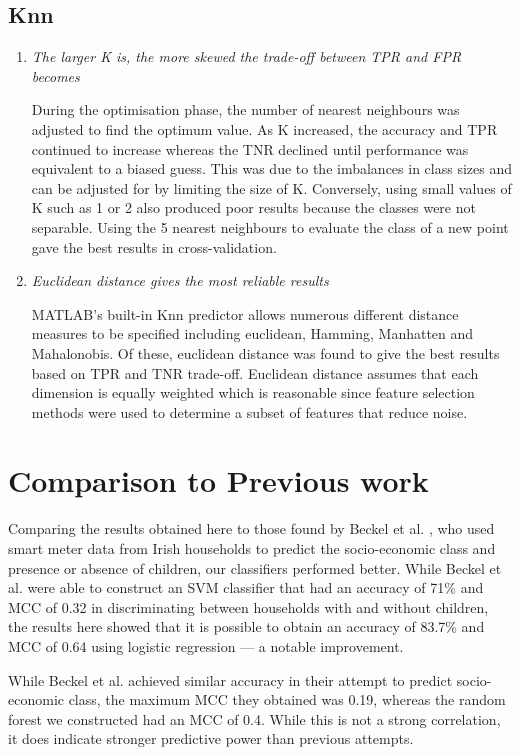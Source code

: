 \pagebreak
\subsection{Knn}

\begin{enumerate}

\item \textit{The larger K is, the more skewed the trade-off between TPR and FPR becomes}

During the optimisation phase, the number of nearest neighbours was adjusted to find the optimum value. As K increased, the accuracy and TPR continued to increase whereas the TNR declined until performance was equivalent to a biased guess. This was due to the imbalances in class sizes and can be adjusted for by limiting the size of K. Conversely, using small values of K such as 1 or 2 also produced poor results because the classes were not separable. Using the 5 nearest neighbours to evaluate the class of a new point gave the best results in cross-validation.

\item \textit{Euclidean distance gives the most reliable results}

MATLAB's built-in Knn predictor allows numerous different distance measures to be specified including euclidean, Hamming, Manhatten and Mahalonobis. Of these, euclidean distance was found to give the best results based on TPR and TNR trade-off. Euclidean distance assumes that each dimension is equally weighted which is reasonable since feature selection methods were used to determine a subset of features that reduce noise.
\end{enumerate}


\section{Comparison to Previous work}

Comparing the results obtained here to those found by Beckel et al. \cite{Beckel_1, Beckel_2, Beckel_3}, who used smart meter data from Irish households to predict the socio-economic class and presence or absence of children, our classifiers performed better. While Beckel et al. were able to construct an SVM classifier that had an accuracy of 71\% and MCC of 0.32 in discriminating between households with and without children, the results here showed that it is possible to obtain an accuracy of 83.7\% and MCC of 0.64 using logistic regression --- a notable improvement. 

While Beckel et al. achieved similar accuracy in their attempt to predict socio-economic class, the maximum MCC they obtained was 0.19, whereas the random forest we constructed had an MCC of 0.4. While this is not a strong correlation, it does indicate stronger predictive power than previous attempts.


